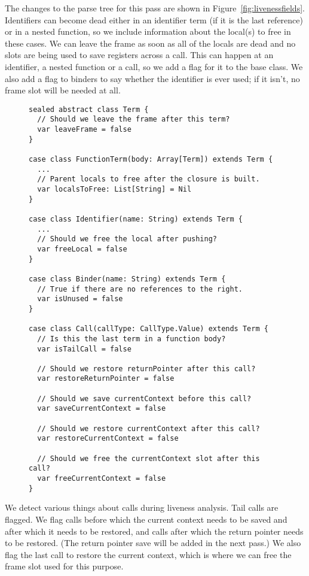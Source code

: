 The changes to the parse tree for this pass
are shown in Figure~\ref{fig:livenessfields}.
Identifiers can become dead either in an identifier term
(if it is the last reference)
or in a nested function,
so we include information about the local(s) to free in these cases.
We can leave the frame as soon as all of the locals are dead
and no slots are being used to save registers across a call.
This can happen at an identifier, a nested function or a call,
so we add a flag for it to the base class.
We also add a flag to binders to say whether the identifier is ever used;
if it isn't, no frame slot will be needed at all.

\begin{figure}
\begin{verbatim}
sealed abstract class Term {
  // Should we leave the frame after this term?
  var leaveFrame = false
}

case class FunctionTerm(body: Array[Term]) extends Term {
  ...
  // Parent locals to free after the closure is built.
  var localsToFree: List[String] = Nil
}

case class Identifier(name: String) extends Term {
  ...
  // Should we free the local after pushing?
  var freeLocal = false
}

case class Binder(name: String) extends Term {
  // True if there are no references to the right.
  var isUnused = false
}

case class Call(callType: CallType.Value) extends Term {
  // Is this the last term in a function body?
  var isTailCall = false

  // Should we restore returnPointer after this call?
  var restoreReturnPointer = false

  // Should we save currentContext before this call?
  var saveCurrentContext = false

  // Should we restore currentContext after this call?
  var restoreCurrentContext = false

  // Should we free the currentContext slot after this call?
  var freeCurrentContext = false
}
\end{verbatim}
\getcaption
\end{figure}

We detect various things about calls during liveness analysis.
Tail calls are flagged.
We flag calls before which the current context needs to be saved
and after which it needs to be restored,
and calls after which the return pointer needs to be restored.
(The return pointer save will be added in the next pass.)
We also flag the last call to restore the current context,
which is where we can free the frame slot used for this purpose.

